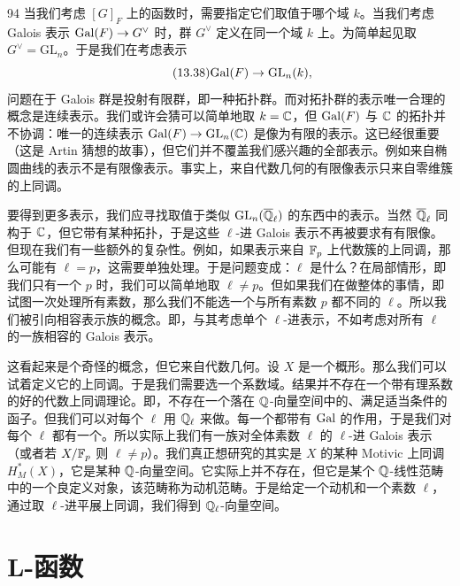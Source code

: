 \begin{srcrem}{94}
当我们考虑 $[G]_F$ 上的函数时，需要指定它们取值于哪个域 $k$。当我们考虑 Galois 表示 $\mathrm{Gal}(F)\to G^\vee$ 时，群 $G^\vee$ 定义在同一个域 $k$ 上。为简单起见取 $G^\vee=\mathrm{GL}_n$。于是我们在考虑表示
\begin{equation}\tag{13.38}
\mathrm{Gal}(F)\to \mathrm{GL}_n(k),
\end{equation}
问题在于 Galois 群是投射有限群，即一种拓扑群。而对拓扑群的表示唯一合理的概念是连续表示。我们或许会猜可以简单地取 $k=\mathbb{C}$，但 $\mathrm{Gal}(F)$ 与 $\mathbb{C}$ 的拓扑并不协调：唯一的连续表示 $\mathrm{Gal}(F)\to\mathrm{GL}_n(\mathbb{C})$ 是像为有限的表示。这已经很重要（这是 Artin 猜想的故事），但它们并不覆盖我们感兴趣的全部表示。例如来自椭圆曲线的表示不是有限像表示。事实上，来自代数几何的有限像表示只来自零维簇的上同调。

要得到更多表示，我们应寻找取值于类似 $\mathrm{GL}_n(\overline{\mathbb{Q}}_\ell)$ 的东西中的表示。当然 $\overline{\mathbb{Q}}_\ell$ 同构于 $\mathbb{C}$，但它带有某种拓扑，于是这些 $\ell$-进 Galois 表示不再被要求有有限像。但现在我们有一些额外的复杂性。例如，如果表示来自 $\mathbb{F}_p$ 上代数簇的上同调，那么可能有 $\ell=p$，这需要单独处理。于是问题变成：$\ell$ 是什么？在局部情形，即我们只有一个 $p$ 时，我们可以简单地取 $\ell\neq p$。但如果我们在做整体的事情，即试图一次处理所有素数，那么我们不能选一个与所有素数 $p$ 都不同的 $\ell$。所以我们被引向相容表示族的概念。即，与其考虑单个 $\ell$-进表示，不如考虑对所有 $\ell$ 的一族相容的 Galois 表示。

这看起来是个奇怪的概念，但它来自代数几何。设 $X$ 是一个概形。那么我们可以试着定义它的上同调。于是我们需要选一个系数域。结果并不存在一个带有理系数的好的代数上同调理论。即，不存在一个落在 $\mathbb{Q}$-向量空间中的、满足适当条件的函子。但我们可以对每个 $\ell$ 用 $\mathbb{Q}_\ell$ 来做。每一个都带有 $\mathrm{Gal}$ 的作用，于是我们对每个 $\ell$ 都有一个。所以实际上我们有一族对全体素数 $\ell$ 的 $\ell$-进 Galois 表示（或者若 $X/\mathbb{F}_p$ 则 $\ell\neq p$）。我们真正想研究的其实是 $X$ 的某种 Motivic 上同调 $H^*_M(X)$，它是某种 $\mathbb{Q}$-向量空间。它实际上并不存在，但它是某个 $\mathbb{Q}$-线性范畴中的一个良定义对象，该范畴称为动机范畴。于是给定一个动机和一个素数 $\ell$，通过取 $\ell$-进平展上同调，我们得到 $\mathbb{Q}_\ell$-向量空间。
\end{srcrem}

\section{L-函数}\label{sec:13-4}

